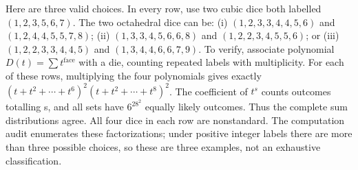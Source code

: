 Here are three valid choices. In every row, use two cubic dice both labelled $(1,2,3,5,6,7)$. The two octahedral dice can be: (i) $(1,2,3,3,4,4,5,6)$ and $(1,2,4,4,5,5,7,8)$; (ii) $(1,3,3,4,5,6,6,8)$ and $(1,2,2,3,4,5,5,6)$; or (iii) $(1,2,2,3,3,4,4,5)$ and $(1,3,4,4,6,6,7,9)$. To verify, associate polynomial $D(t)=\sum t^{\text{face}}$ with a die, counting repeated labels with multiplicity. For each of these rows, multiplying the four polynomials gives exactly $(t+t^2+\cdots+t^6)^2(t+t^2+\cdots+t^8)^2$. The coefficient of $t^s$ counts outcomes totalling s, and all sets have $6^28^2$ equally likely outcomes. Thus the complete sum distributions agree. All four dice in each row are nonstandard. The computation audit enumerates these factorizations; under positive integer labels there are more than three possible choices, so these are three examples, not an exhaustive classification.
